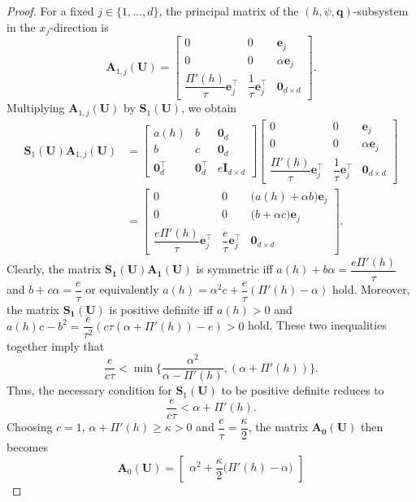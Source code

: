 \documentclass[10pt,a4paper]{amsart}
\begin{document}
\begin{proof}
For a fixed $j\in\{1,\ldots,d\}$, the principal matrix of the
$(h,\psi,\mathbf q)$-subsystem in the $x_j$-direction is
\[
\mathbf A_{1,j}(\mathbf U)
=
\begin{bmatrix}
0&0&\mathbf e_j\\
0&0&\alpha\mathbf e_j\\
\dfrac{\Pi'(h)}{\tau}\mathbf e_j^\top&
\dfrac1\tau\mathbf e_j^\top&
\mathbf 0_{d\times d}
\end{bmatrix}.
\]
Multiplying $\mathbf A_{1,j}(\mathbf U)$ by
$\mathbf S_1(\mathbf U)$, we obtain
\begin{align*}
\mathbf S_1(\mathbf U)\mathbf A_{1,j}(\mathbf U)
&=
\begin{bmatrix}
a(h)&b&\mathbf 0_d\\
b&c&\mathbf 0_d\\
\mathbf 0_d^\top&\mathbf 0_d^\top&
e\mathbf I_{d\times d}
\end{bmatrix}
\begin{bmatrix}
0&0&\mathbf e_j\\
0&0&\alpha\mathbf e_j\\
\dfrac{\Pi'(h)}{\tau}\mathbf e_j^\top&
\dfrac1\tau\mathbf e_j^\top&
\mathbf 0_{d\times d}
\end{bmatrix}
\\
&=
\begin{bmatrix}
0&0&\bigl(a(h)+\alpha b\bigr)\mathbf e_j\\
0&0&\bigl(b+\alpha c\bigr)\mathbf e_j\\
\dfrac{e\Pi'(h)}{\tau}\mathbf e_j^\top&
\dfrac e\tau\mathbf e_j^\top&
\mathbf 0_{d\times d}
\end{bmatrix}.
\end{align*}
Clearly, the matrix $\mathbf{S_1(U)}\mathbf{A_1(U)}$ is symmetric iff $a(h)+b\alpha=\dfrac{e\Pi'(h)}{\tau}$ and $b+c\alpha=\dfrac{e}{\tau}$ or equivalently $a(h)=\alpha^2 c+\dfrac{e}{\tau}(\Pi'(h)-\alpha)$ hold. Moreover, the matrix $\mathbf{S_1(U)}$ is positive definite iff $a(h)>0$ and $a(h)c-b^2=\dfrac{e}{\tau^2}(c\tau(\alpha+\Pi'(h))-e)>0$ hold. These two inequalities together imply that
\[
\dfrac{e}{c\tau}<\min\bigg\{\dfrac{\alpha^2}{\alpha-\Pi'(h)}, (\alpha+\Pi'(h))\bigg\}.
\]
Thus, the necessary condition for $\mathbf{S}_1(\mathbf{U})$ to be positive definite reduces to
\[
\dfrac{e}{c\tau}<\alpha+\Pi'(h).
\]
Choosing $c=1$, $\alpha+\Pi'(h)\geq \kappa>0$ and $\dfrac{e}{\tau}=\dfrac{\kappa}{2}$, the matrix $\mathbf{A_0(U)}$ then becomes
\[
\mathbf A_0(\mathbf U)
=
\begin{bmatrix}
\alpha^2+\dfrac{\kappa}{2}\bigl(\Pi'(h)-\alpha\bigr)

\end{bmatrix}\]
\end{proof}
\end{document}

